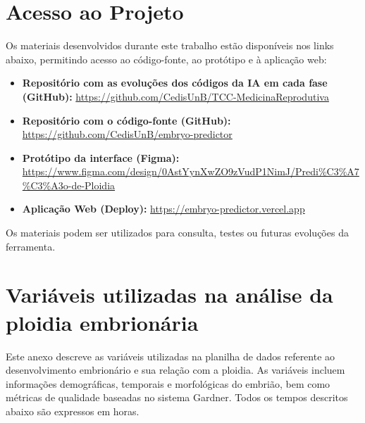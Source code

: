 \begin{apendicesenv}

\partapendices

\chapter{Acesso ao Projeto}
\label{apendice:acesso}

Os materiais desenvolvidos durante este trabalho estão disponíveis nos links abaixo, permitindo acesso ao código-fonte, ao protótipo e à aplicação web:

\begin{footnotesize}
\begin{itemize}
    \item \textbf{Repositório com as evoluções dos códigos da IA em cada fase (GitHub):} \url{https://github.com/CedisUnB/TCC-MedicinaReprodutiva}

    \item \textbf{Repositório com o código-fonte (GitHub):} \url{https://github.com/CedisUnB/embryo-predictor}
    
    \item \textbf{Protótipo da interface (Figma):} \url{https://www.figma.com/design/0AstYynXwZO9zVudP1NimJ/Predi%C3%A7%C3%A3o-de-Ploidia}
    
    \item \textbf{Aplicação Web (Deploy):} \url{https://embryo-predictor.vercel.app}
\end{itemize}
\end{footnotesize}

Os materiais podem ser utilizados para consulta, testes ou futuras evoluções da ferramenta.

\chapter{Variáveis utilizadas na análise da ploidia embrionária}
\label{apendice:variaveis}

Este anexo descreve as variáveis utilizadas na planilha de dados referente ao desenvolvimento embrionário e sua relação com a ploidia. As variáveis incluem informações demográficas, temporais e morfológicas do embrião, bem como métricas de qualidade baseadas no sistema Gardner. Todos os tempos descritos abaixo são expressos em horas.


\end{apendicesenv}
